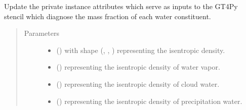 \documentclass[letterpaper,10pt,english]{sphinxmanual}
\begin{document}
\begin{fulllineitems}
\begin{fulllineitems}
\label{\detokenize{api:tasmania.dycore.diagnostic_isentropic.DiagnosticIsentropic._stencil_diagnosing_mass_fraction_of_water_constituents_in_air_set_inputs}}
Update the private instance attributes which serve as inputs to the GT4Py stencil which diagnose
the mass fraction of each water constituent.
\begin{quote}\begin{description}
\item[{Parameters}] \leavevmode\begin{itemize}
\item {} 
 () \textendash{}  with shape (, , ) representing the isentropic density.

\item {} 
 () \textendash{}  representing the isentropic density of water vapor.

\item {} 
 () \textendash{}  representing the isentropic density of cloud water.

\item {} 
 () \textendash{}  representing the isentropic density of precipitation water.

\end{itemize}

\end{description}\end{quote}

\end{fulllineitems}



\end{fulllineitems}
\end{document}
